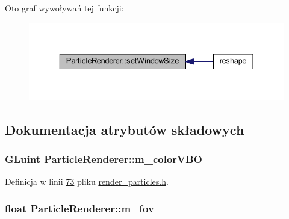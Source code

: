 Oto graf wywoływań tej funkcji\-:\nopagebreak
\begin{figure}[H]
\begin{center}
\leavevmode
\includegraphics[width=329pt]{class_particle_renderer_ad84b464475e5ebd42cfed6e2e91e7247_icgraph}
\end{center}
\end{figure}




\subsection{Dokumentacja atrybutów składowych}
\hypertarget{class_particle_renderer_a7dcaa73a41c598207974432206b423b5}{
\subsubsection[{m\-\_\-color\-V\-B\-O}]{\setlength{\rightskip}{0pt plus 5cm}G\-Luint Particle\-Renderer\-::m\-\_\-color\-V\-B\-O\hspace{0.3cm}{\ttfamily [protected]}}}\label{class_particle_renderer_a7dcaa73a41c598207974432206b423b5}


Definicja w linii \hyperlink{render__particles_8h_source_l00073}{73} pliku \hyperlink{render__particles_8h_source}{render\-\_\-particles.\-h}.

\hypertarget{class_particle_renderer_a0aed003bd557a3c32ca7d2ca89fc59f7}{
\subsubsection[{m\-\_\-fov}]{\setlength{\rightskip}{0pt plus 5cm}float Particle\-Renderer\-::m\-\_\-fov\hspace{0.3cm}{\ttfamily [protected]}}}\label{class_particle_renderer_a0aed003bd557a3c32ca7d2ca89fc59f7}


